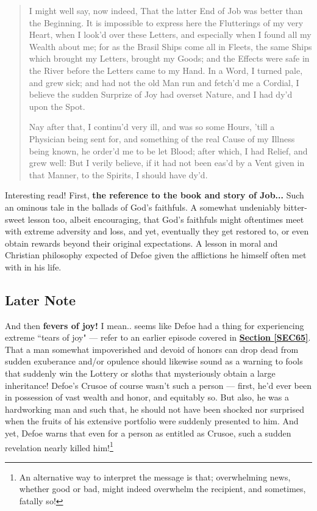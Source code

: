 \documentclass[a4paper]{article}
\begin{document}
\noindent
\begin{minipage}{1\textwidth}
\vspace{1em}
\begin{quotation}
{\ttfamily


I might well say, now indeed, That the latter End of Job was better than the Beginning. It is impossible to express here the Flutterings of my very Heart, when I look’d over these Letters, and especially when I found all my Wealth about me; for as the Brasil Ships come all in Fleets, the same Ships which brought my Letters, brought my Goods; and the Effects were safe in the River before the Letters came to my Hand. In a Word, I turned pale, and grew sick;
and had not the old Man run and fetch’d me a Cordial, I believe the sudden Surprize of Joy had overset Nature, and I had dy’d upon the Spot.

Nay after that, I continu’d very ill, and was so some Hours, ’till a Physician being sent for, and something of the real Cause of my Illness being known, he order’d me to be let Blood; after which, I had Relief, and grew well: But I verily believe, if it had not been eas’d by a Vent given in that Manner, to the Spirits, I should have dy'd.


}
\end{quotation}
\vspace{1em}
\end{minipage}



Interesting read! First, \textbf{the reference to the book and story of Job...} Such an ominous tale in the ballads of God's faithfuls. A somewhat undeniably bitter-sweet lesson too, albeit encouraging, that God's faithfuls might oftentimes meet with extreme adversity and loss, and yet, eventually they get restored to, or even obtain rewards beyond their original expectations. A lesson in moral and Christian philosophy expected of Defoe given the afflictions he himself often met with in his life.


\subsection{Later Note}


And then \textbf{fevers of joy!} I mean.. seems like Defoe had a thing for experiencing extreme ``tears of joy" --- refer to an earlier episode covered in \textbf{\hyperref[SEC65]{Section \ref{SEC65}}}. That a man somewhat impoverished and devoid of honors can drop dead from sudden exuberance and/or opulence should likewise sound as a warning to fools that suddenly win the Lottery or sloths that mysteriously obtain a large inheritance! Defoe's Crusoe of course wasn't such a person --- first, he'd ever been in possession of vast wealth and honor, and equitably so. But also, he was a hardworking man and such that, he should not have been shocked nor surprised when the fruits of his extensive portfolio were suddenly presented to him. And yet, Defoe warns that even for a person as entitled as Crusoe, such a sudden revelation nearly killed him!\footnote{An alternative way to interpret the message is that; overwhelming news, whether good or bad, might indeed overwhelm the recipient, and sometimes, fatally so!}
\end{document}
